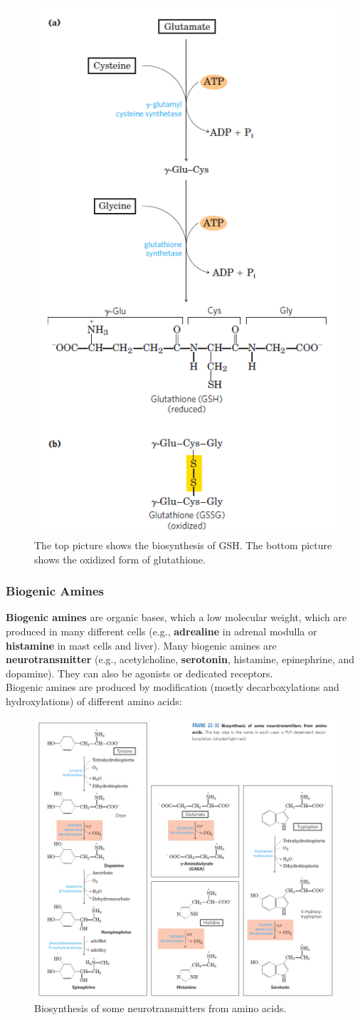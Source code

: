 \documentclass[../main.tex]{subfiles}
\begin{document}
\begin{figure}[H]
	\centering
	\includegraphics[width=0.3\linewidth]{gsh}
	\caption{The top picture shows the biosynthesis of GSH. The bottom picture shows the oxidized form of glutathione.}
	\label{fig:gsh}
\end{figure}

\subsubsection{Biogenic Amines}

\textbf{\gls{Biogenic amines}} are organic bases, which a low molecular weight, which are produced in many different cells (e.g., \textbf{adrealine} in adrenal modulla or \textbf{histamine} in mast cells and liver). Many biogenic amines are \textbf{\gls{neurotransmitter}} (e.g., acetylcholine, \textbf{serotonin}, histamine, epinephrine, and dopamine). They can also be agonists or dedicated receptors. \\

Biogenic amines are produced by modification (mostly decarboxylations and hydroxylations) of different amino acids:

\begin{figure}[H]
	\centering
	\includegraphics[width=0.7\linewidth]{biogenics}
	\caption{Biosynthesis of some neurotransmitters from amino acids.}
	\label{fig:biogenics}
\end{figure}
\end{document}
